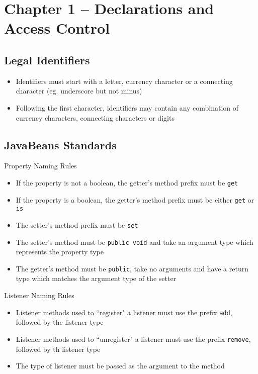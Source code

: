 \section{Chapter 1 -- Declarations and Access Control}
\subsection{Legal Identifiers}
\begin{itemize}
    \item Identifiers must start with a letter, currency character or a 
    connecting character (eg. underscore but not minus)
    \item Following the first character, identifiers may contain any 
    combination of currency characters, connecting characters or digits
\end{itemize}

\subsection{JavaBeans Standards}
Property Naming Rules
\begin{itemize}
    \item If the property is not a boolean, the getter's method prefix must be 
    \verb#get#
    \item If the property is a boolean, the getter's method prefix must be 
    either \verb#get# or \verb#is#
    \item The setter's method prefix must be \verb#set#
    \item The setter's method must be \verb#public void# and take an argument 
    type which represents the property type
    \item The getter's method must be \verb#public#, take no arguments and have 
    a return type which matches the argument type of the setter
\end{itemize}
Listener Naming Rules
\begin{itemize}
    \item Listener methods used to ``register" a listener must use the prefix 
    \verb#add#, followed by the listener type
    \item Listener methods used to ``unregister" a listener must use the prefix 
    \verb#remove#, followed by th listener type
    \item The type of listener must be passed as the argument to the method
\end{itemize}

